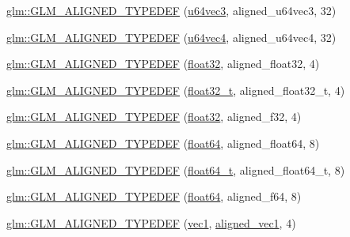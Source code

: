 \begin{DoxyCompactItemize}
\item 
\hyperlink{group__gtx__type__aligned_gae373b6c04fdf9879f33d63e6949c037e}{glm\+::\+G\+L\+M\+\_\+\+A\+L\+I\+G\+N\+E\+D\+\_\+\+T\+Y\+P\+E\+D\+EF} (\hyperlink{group__gtc__type__precision_ga2d3e22f2413f79536d5cf3561949cd53}{u64vec3}, aligned\+\_\+u64vec3, 32)
\item 
\hyperlink{group__gtx__type__aligned_ga53a8a03dca2015baec4584f45b8e9cdc}{glm\+::\+G\+L\+M\+\_\+\+A\+L\+I\+G\+N\+E\+D\+\_\+\+T\+Y\+P\+E\+D\+EF} (\hyperlink{group__gtc__type__precision_ga70396c4f422824503c870db50b3059fd}{u64vec4}, aligned\+\_\+u64vec4, 32)
\item 
\hyperlink{group__gtx__type__aligned_gab3301bae94ef5bf59fbdd9a24e7d2a01}{glm\+::\+G\+L\+M\+\_\+\+A\+L\+I\+G\+N\+E\+D\+\_\+\+T\+Y\+P\+E\+D\+EF} (\hyperlink{group__gtc__type__precision_ga814f2f65354b6588b067cc5c67a6b340}{float32}, aligned\+\_\+float32, 4)
\item 
\hyperlink{group__gtx__type__aligned_gada9b0bea273d3ae0286f891533b9568f}{glm\+::\+G\+L\+M\+\_\+\+A\+L\+I\+G\+N\+E\+D\+\_\+\+T\+Y\+P\+E\+D\+EF} (\hyperlink{group__gtc__type__precision_ga642737ae3e7c434b366f2191e6944bf2}{float32\+\_\+t}, aligned\+\_\+float32\+\_\+t, 4)
\item 
\hyperlink{group__gtx__type__aligned_gadbce23b9f23d77bb3884e289a574ebd5}{glm\+::\+G\+L\+M\+\_\+\+A\+L\+I\+G\+N\+E\+D\+\_\+\+T\+Y\+P\+E\+D\+EF} (\hyperlink{group__gtc__type__precision_ga814f2f65354b6588b067cc5c67a6b340}{float32}, aligned\+\_\+f32, 4)
\item 
\hyperlink{group__gtx__type__aligned_ga75930684ff2233171c573e603f216162}{glm\+::\+G\+L\+M\+\_\+\+A\+L\+I\+G\+N\+E\+D\+\_\+\+T\+Y\+P\+E\+D\+EF} (\hyperlink{group__gtc__type__precision_gab721f828b41f46b20cf4883b50733d3b}{float64}, aligned\+\_\+float64, 8)
\item 
\hyperlink{group__gtx__type__aligned_ga6e3a2d83b131336219a0f4c7cbba2a48}{glm\+::\+G\+L\+M\+\_\+\+A\+L\+I\+G\+N\+E\+D\+\_\+\+T\+Y\+P\+E\+D\+EF} (\hyperlink{group__gtc__type__precision_gade966a3eb25ebeb16dd53c40d3fdeb46}{float64\+\_\+t}, aligned\+\_\+float64\+\_\+t, 8)
\item 
\hyperlink{group__gtx__type__aligned_gaa4deaa0dea930c393d55e7a4352b0a20}{glm\+::\+G\+L\+M\+\_\+\+A\+L\+I\+G\+N\+E\+D\+\_\+\+T\+Y\+P\+E\+D\+EF} (\hyperlink{group__gtc__type__precision_gab721f828b41f46b20cf4883b50733d3b}{float64}, aligned\+\_\+f64, 8)
\item 
\hyperlink{group__gtx__type__aligned_ga81bc497b2bfc6f80bab690c6ee28f0f9}{glm\+::\+G\+L\+M\+\_\+\+A\+L\+I\+G\+N\+E\+D\+\_\+\+T\+Y\+P\+E\+D\+EF} (\hyperlink{group__ext__vec1_ga16030dae9029ed1eab1553a2183bbb79}{vec1}, \hyperlink{group__gtc__type__aligned_ga8cf75c112dfa39264b7ef65c2ed6b3c4}{aligned\+\_\+vec1}, 4)

\end{DoxyCompactItemize}
